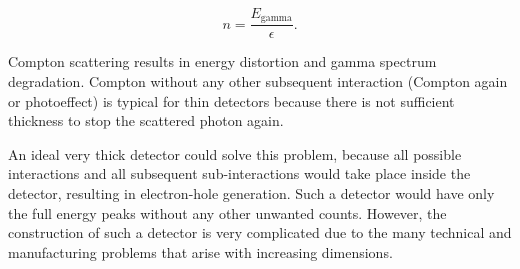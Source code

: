 \begin{equation}
n = \frac{E_{\textrm{gamma}}}{\epsilon}.
\end{equation}

\par
Compton scattering results in energy distortion and gamma spectrum degradation. Compton without any other subsequent interaction (Compton again or photoeffect) is typical for thin detectors because there is not sufficient thickness to stop the scattered photon again.

\par
An ideal very thick detector could solve this problem, because all possible interactions and all subsequent sub-interactions would take place inside the detector, resulting in electron-hole generation. Such a detector would have only the full energy peaks without any other unwanted counts. However, the construction of such a detector is very complicated due to the many technical and manufacturing problems that arise with increasing dimensions. 

